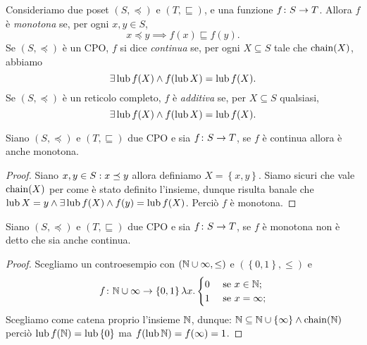 \begin{definizione} 
Consideriamo due poset $(S, \preceq)$ e $(T, \sqsubseteq)$,
e una funzione $\mathord{f}\colon S\to T$.
Allora
$f$ è \emph{monotona} se, per ogni $x, y \in S$,
\[
  x \preceq y \implies f(x) \sqsubseteq f(y).
\]
Se $(S, \preceq)$ \`e un CPO,
$f$ si dice \emph{continua} se, per ogni $X \subseteq S$ tale che $\mathop{\mathrm{chain}}\nolimits(X)$,
abbiamo
\[
  \exists \mathop{\mathrm{lub}}\nolimits f(X) \land f(\mathop{\mathrm{lub}}\nolimits X) = \mathop{\mathrm{lub}}\nolimits f(X).
\]
Se $(S, \preceq)$ \`e un reticolo completo,
$f$ è \emph{additiva} se, per $X \subseteq S$ qualsiasi,
\[
  \exists \mathop{\mathrm{lub}}\nolimits f(X) \land f(\mathop{\mathrm{lub}}\nolimits X) = \mathop{\mathrm{lub}}\nolimits f(X).
\]
\end{definizione}


\begin{proposizione} 
Siano $(S, \preceq)$ e $(T, \sqsubseteq)$ due CPO e sia $\mathord{f}\colon S\to T$, se $f$ è continua allora è anche monotona.
\end{proposizione}
\begin{proof}
Siano $x,y \in S \mathrel{:} x \preceq y$ allora definiamo $X = \left\{x,y\right\}$. Siamo sicuri che vale $\mathop{\mathrm{chain}}\nolimits(X)$ per come è stato definito l'insieme, dunque risulta banale che $\mathop{\mathrm{lub}}\nolimits X = y \land \exists \mathop{\mathrm{lub}}\nolimits f(X) \land f(y) = \mathop{\mathrm{lub}}\nolimits f(X)$. Perciò $f$ è monotona.
\end{proof}

\begin{proposizione} 
Siano $(S, \preceq)$ e $(T, \sqsubseteq)$ due CPO e sia $\mathord{f}\colon S\to T$, se $f$ è monotona non è detto che sia anche continua.
\end{proposizione}
\begin{proof}
Scegliamo un controesempio con $(\mathbb{N} \cup \infty, \leq)$ e $(\left\{0,1\right\},\leq)$ e
\[
\mathord{f}\colon\mathbb{N} \cup \infty\to\left\{0,1\right\} \lambda x.
        \begin{cases}
        0 & \text{ se } x \in \mathbb{N}; \\
        1 & \text{ se } x = \infty;
    \end{cases}
\]
Scegliamo come catena proprio l'insieme $\mathbb{N}$, dunque:
$\mathbb{N} \subseteq \mathbb{N} \cup \left\{\infty\right\} \land \mathop{\mathrm{chain}}\nolimits(\mathbb{N})$ perciò $\mathop{\mathrm{lub}}\nolimits f(\mathbb{N}) = \mathop{\mathrm{lub}}\nolimits \left\{0\right\}$ ma $f(\mathop{\mathrm{lub}}\nolimits \mathbb{N}) = f(\infty) = 1$.
\end{proof}


